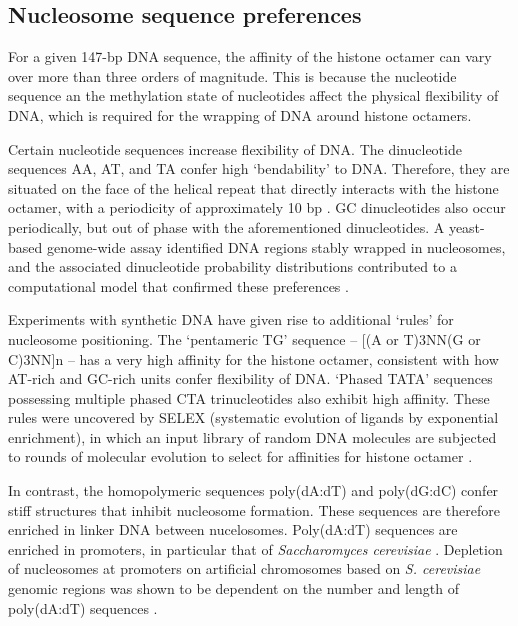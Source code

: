 \documentclass[parskip=full, numbers=noenddot]{scrreprt}
\begin{document}
\subsection{Nucleosome sequence preferences}
\label{ssec:emsaselex_intro_seqpref}

For a given 147-bp DNA sequence, the affinity of the histone octamer can vary over more than three orders of magnitude.  This is because the nucleotide sequence an the methylation state of nucleotides affect the physical flexibility of DNA, which is required for the wrapping of DNA around histone octamers.

Certain nucleotide sequences increase flexibility of DNA.  The dinucleotide sequences AA, AT, and TA confer high `bendability' to DNA.  Therefore, they are situated on the face of the helical repeat that directly interacts with the histone octamer, with a periodicity of approximately 10 bp \citep{struhl_determinants_2013}.  GC dinucleotides also occur periodically, but out of phase with the aforementioned dinucleotides.  A yeast-based genome-wide assay identified DNA regions stably wrapped in nucleosomes, and the associated dinucleotide probability distributions contributed to a computational model that confirmed these preferences \citep{segal_genomic_2006}.

Experiments with synthetic DNA have given rise to additional `rules' for nucleosome positioning.  The `pentameric TG' sequence -- [(A or T)3NN(G or C)3NN]n -- has a very high affinity for the histone octamer, consistent with how AT-rich and GC-rich units confer flexibility of DNA.  `Phased TATA' sequences possessing multiple phased CTA trinucleotides also exhibit high affinity.  These rules were uncovered by SELEX (systematic evolution of ligands by exponential enrichment), in which an input library of random DNA molecules are subjected to rounds of molecular evolution to select for affinities for histone octamer \citep{lowary_new_1998}.

In contrast, the homopolymeric sequences poly(dA:dT) and poly(dG:dC) confer stiff structures that inhibit nucleosome formation.  These sequences are therefore enriched in linker DNA between nucelosomes.  Poly(dA:dT) sequences are enriched in promoters, in particular that of \emph{Saccharomyces cerevisiae} \citep{struhl_determinants_2013}.  Depletion of nucleosomes at promoters on artificial chromosomes based on \emph{S. cerevisiae} genomic regions was shown to be dependent on the number and length of poly(dA:dT) sequences \citep{hughes_functional_2012}.
\end{document}
